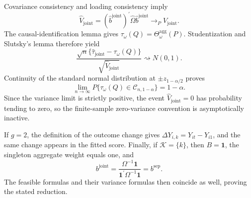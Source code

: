 Covariance consistency and loading consistency imply
\[
 \widehat V_{\mathrm{joint}}
 = (\widehat b^{\mathrm{joint}})^{\prime}
   \widehat\Omega\widehat b^{\mathrm{joint}}
 \to_PV_{\mathrm{joint}}.
\]
The causal-identification lemma gives
\(\tau_\omega(Q)=\Theta_\omega^{\mathrm{agg}}(P)\).  Studentization and Slutsky's lemma therefore yield
\[
 \frac{\sqrt n\{\widehat\tau_{\mathrm{joint}}-\tau_\omega(Q)\}}
      {\sqrt{\widehat V_{\mathrm{joint}}}}
 \rightsquigarrow N(0,1).
\]
Continuity of the standard normal distribution at \(\pm z_{1-\alpha/2}\) proves
\[
 \lim_{n\to\infty}P\{\tau_\omega(Q)\in\mathcal C_{n,1-\alpha}\}=1-\alpha.
\]
Since the variance limit is strictly positive, the event \(\widehat V_{\mathrm{joint}}=0\) has probability tending to zero, so the finite-sample zero-variance convention is asymptotically inactive.

If \(g=2\), the definition of the outcome change gives \(\Delta Y_{i,k}=Y_{it}-Y_{i1}\), and the same change appears in the fitted score.  Finally, if \(\mathcal K=\{k\}\), then \(B=\mathbf 1\), the singleton aggregate weight equals one, and
\[
 b^{\mathrm{joint}}
 =\frac{\Omega^{-1}\mathbf 1}{\mathbf 1^{\prime}\Omega^{-1}\mathbf 1}
 =b^{\mathrm{sep}}.
\]
The feasible formulas and their variance formulas then coincide as well, proving the stated reduction.